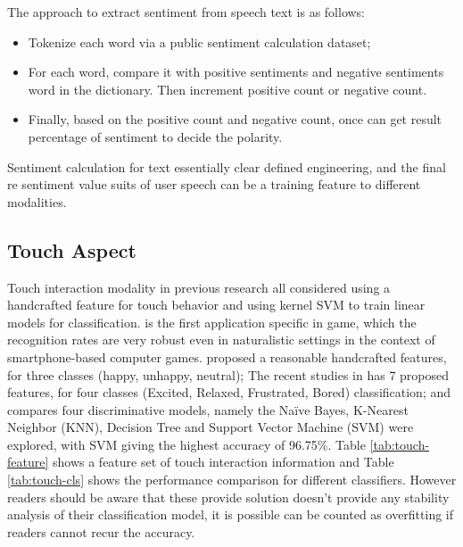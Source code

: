 The approach to extract sentiment from speech text is
as follows:
\begin{itemize}
  \item Tokenize each word via a public sentiment calculation dataset;
  \item For each word, compare it with positive sentiments and negative sentiments word in the dictionary. Then increment positive count or negative count.
  \item Finally, based on the positive count and negative count, once can get result percentage of sentiment to decide the polarity.
\end{itemize}

Sentiment calculation for text essentially clear defined engineering, and the final re sentiment value suits of user speech can be a training feature to different modalities.

\subsection{Touch Aspect}\label{subsec:touch-model}

Touch interaction modality in previous research all considered using a handcrafted feature for touch behavior and using kernel SVM to train linear models for classification. \cite{Gao2012} is the first application specific in game, which the recognition rates are very robust even in naturalistic settings in the context of smartphone-based computer games. 
\cite{Shah2015} proposed a reasonable handcrafted features, for three classes (happy, unhappy, neutral); The recent studies in \cite{bhattacharya2017predictive} has 7 proposed features, for four classes (Excited, Relaxed, Frustrated, Bored) classification; and \cite{Tikadar2017} compares four discriminative models, namely the Naïve Bayes, K-Nearest Neighbor (KNN), Decision Tree and Support Vector Machine (SVM) were explored, with SVM giving the highest accuracy of 96.75\%. Table \ref{tab:touch-feature} shows a feature set of touch interaction information and Table \ref{tab:touch-cls} shows the performance comparison for different classifiers. However readers should be aware that these provide solution doesn't provide any stability analysis of their classification model, it is possible can be counted as overfitting if readers cannot recur the accuracy.

